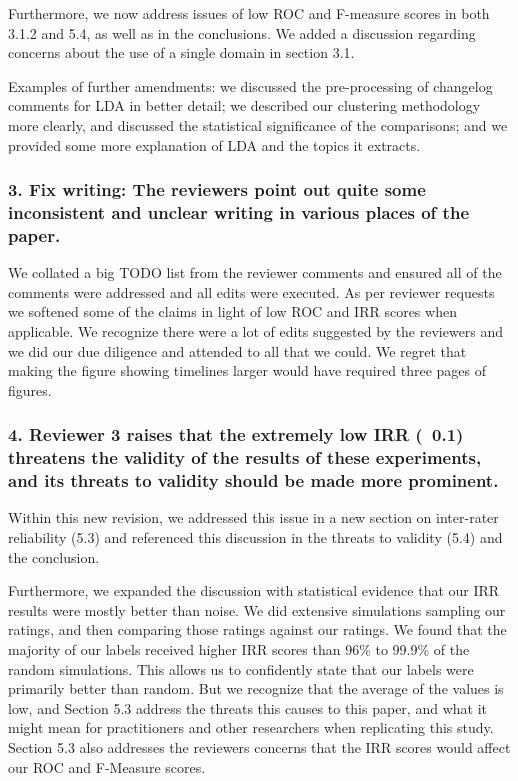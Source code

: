 \documentclass{article}
\begin{document}
Furthermore, we now address issues of low ROC and F-measure scores in
both 3.1.2 and 5.4, as well as in the conclusions. We added a discussion regarding concerns about the use of a single domain in section 3.1.

Examples of further amendments: we discussed the pre-processing
of changelog comments for LDA in better detail; we described our
clustering methodology more clearly, and discussed the statistical significance of
the comparisons; and we provided some more explanation of LDA and the
topics it extracts.

\subsubsection*{
  3. Fix writing: The reviewers point out quite some inconsistent and
  unclear writing in various places of the paper.}

We collated a big TODO list from the reviewer comments and ensured all of
the comments were addressed and all edits were executed. 
As per reviewer requests we softened some of the claims in light of low ROC and IRR scores when applicable.
We recognize there were a lot of edits suggested by the reviewers and
we did our due diligence and attended to all that we could. We regret that making the figure showing timelines 
larger would have required three pages of figures. 

\subsubsection*{4.  Reviewer 3 raises that the extremely low IRR (~0.1) threatens the
   validity of the results of these experiments, and its threats to
   validity should be made more prominent.}

Within this new revision, we addressed this issue in a new section on inter-rater
reliability (5.3) and referenced this discussion in the threats to
validity (5.4) and the conclusion. 

Furthermore, we expanded the discussion with statistical evidence that our IRR results were mostly
better than noise. We did extensive simulations sampling our ratings,
and then comparing those ratings against our ratings. We found that the
majority of our labels received higher IRR scores than 96\% to 99.9\%
of the random simulations. This allows us to confidently state that our
labels were primarily better than random. But we recognize that the
average of the values is low, and Section 5.3 address the threats this causes to
this paper, and what it might mean for practitioners and other
researchers when replicating this study. Section 5.3 also addresses the reviewers concerns that the IRR scores would
affect our ROC and F-Measure scores. 
\end{document}
